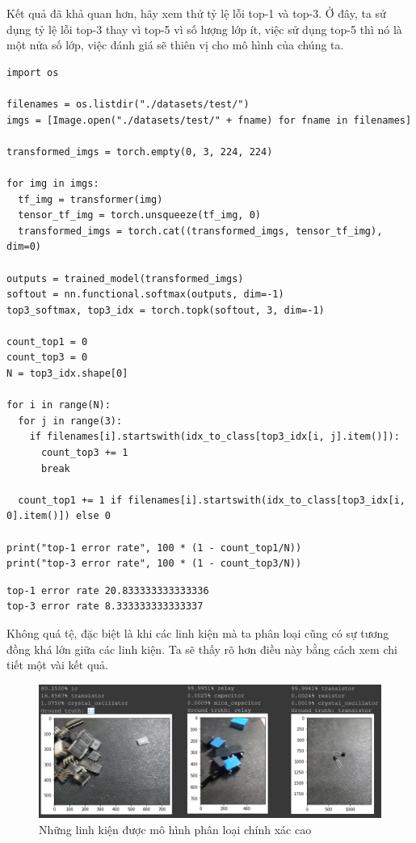 \documentclass[a4paper]{article}
\begin{document}
\noindent
Kết quả đã khả quan hơn, hãy xem thử tỷ lệ lỗi top-1 và top-3. Ở đây, ta sử dụng tỷ lệ lỗi top-3 thay vì top-5 vì số lượng lớp ít, việc sử dụng top-5 thì nó là một nửa số lớp, việc đánh giá sẽ thiên vị cho mô hình của chúng ta.
\begin{lstlisting}
import os

filenames = os.listdir("./datasets/test/")
imgs = [Image.open("./datasets/test/" + fname) for fname in filenames]

transformed_imgs = torch.empty(0, 3, 224, 224)

for img in imgs:
  tf_img = transformer(img)
  tensor_tf_img = torch.unsqueeze(tf_img, 0)
  transformed_imgs = torch.cat((transformed_imgs, tensor_tf_img), dim=0)

outputs = trained_model(transformed_imgs)
softout = nn.functional.softmax(outputs, dim=-1)
top3_softmax, top3_idx = torch.topk(softout, 3, dim=-1)

count_top1 = 0
count_top3 = 0
N = top3_idx.shape[0]

for i in range(N):
  for j in range(3):
    if filenames[i].startswith(idx_to_class[top3_idx[i, j].item()]):
      count_top3 += 1
      break

  count_top1 += 1 if filenames[i].startswith(idx_to_class[top3_idx[i, 0].item()]) else 0

print("top-1 error rate", 100 * (1 - count_top1/N))
print("top-3 error rate", 100 * (1 - count_top3/N))
\end{lstlisting}
\begin{verbatim}
top-1 error rate 20.833333333333336
top-3 error rate 8.333333333333337
\end{verbatim}
Không quá tệ, đặc biệt là khi các linh kiện mà ta phân loại cũng có sự tương đồng khá lớn giữa các linh kiện. Ta sẽ thấy rõ hơn điều này bằng cách xem chi tiết một vài kết quả.
\begin{figure}[h!]
\centering
\includegraphics[width=15cm]{images/result1.PNG}
\caption{Những linh kiện được mô hình phân loại chính xác cao}
\end{figure}
\end{document}
